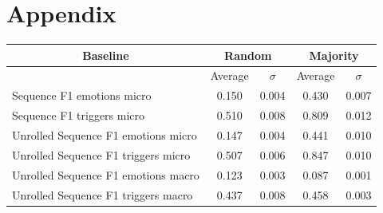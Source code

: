 \documentclass[11pt,table,xcdraw]{article}
\begin{document}
\begin{table}[h]
\appendix
\section{Appendix}
\label{appendix_results}
\begin{tabular}{|l|cc|cc|}
\hline
\multicolumn{1}{|c|}{\textbf{Baseline}}              & \multicolumn{2}{c|}{Random}                                             & \multicolumn{2}{c|}{Majority}                                           \\ \hline
\multicolumn{1}{|c|}{}              & \multicolumn{1}{c|}{Average}                            & $\sigma$                         & \multicolumn{1}{c|}{Average}                            & $\sigma$                         \\ \hline
Sequence F1 emotions micro          & \multicolumn{1}{c|}{\cellcolor[HTML]{CB0000}0.150} & \cellcolor[HTML]{FFFFFF}0.004 & \multicolumn{1}{c|}{\cellcolor[HTML]{F8A102}0.430} & \cellcolor[HTML]{FFFFFF}0.007 \\ \hline
Sequence F1 triggers micro          & \multicolumn{1}{c|}{\cellcolor[HTML]{F8A102}0.510} & \cellcolor[HTML]{FFFFFF}0.008 & \multicolumn{1}{c|}{\cellcolor[HTML]{32CB00}0.809} & \cellcolor[HTML]{FFFFFF}0.012 \\ \hline
Unrolled Sequence F1 emotions micro & \multicolumn{1}{c|}{\cellcolor[HTML]{CB0000}0.147} & \cellcolor[HTML]{FFFFFF}0.004 & \multicolumn{1}{c|}{\cellcolor[HTML]{F8A102}0.441} & \cellcolor[HTML]{FFFFFF}0.010 \\ \hline
Unrolled Sequence F1 triggers micro & \multicolumn{1}{c|}{\cellcolor[HTML]{F8A102}0.507} & \cellcolor[HTML]{FFFFFF}0.006 & \multicolumn{1}{c|}{\cellcolor[HTML]{32CB00}0.847} & \cellcolor[HTML]{FFFFFF}0.010 \\ \hline
Unrolled Sequence F1 emotions macro & \multicolumn{1}{c|}{\cellcolor[HTML]{CB0000}0.123} & \cellcolor[HTML]{FFFFFF}0.003 & \multicolumn{1}{c|}{\cellcolor[HTML]{CB0000}0.087} & \cellcolor[HTML]{FFFFFF}0.001 \\ \hline
Unrolled Sequence F1 triggers macro & \multicolumn{1}{c|}{\cellcolor[HTML]{F8A102}0.437} & \cellcolor[HTML]{FFFFFF}0.008 & \multicolumn{1}{c|}{\cellcolor[HTML]{F8A102}0.458} & \cellcolor[HTML]{FFFFFF}0.003 \\ \hline
\end{tabular}


\end{table}
\end{document}

